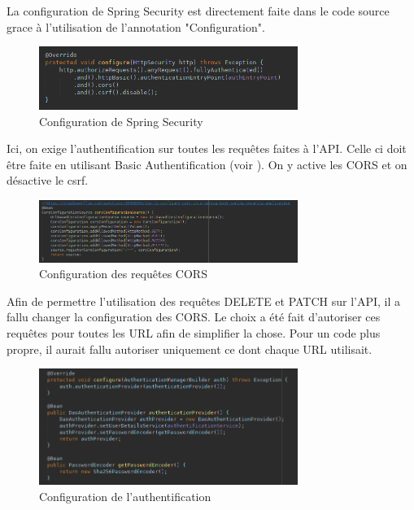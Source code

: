 			La configuration de Spring Security est directement faite dans le code source grace à l'utilisation de l'annotation "Configuration".

			\begin{figure}[H]
				\centering\includegraphics[width=0.75\textwidth, keepaspectratio]{res/config-httpsecurity.png}
				\caption{Configuration de Spring Security}
			\end{figure}

			Ici, on exige l'authentification sur toutes les requêtes faites à l'API. Celle ci doit être faite en utilisant Basic Authentification (voir ). On y active les CORS et on désactive le csrf.

			\begin{figure}[H]
				\centering\includegraphics[width=0.75\textwidth, keepaspectratio]{res/config-cors.png}
				\caption{Configuration des requêtes CORS}
			\end{figure}

			Afin de permettre l'utilisation des requêtes DELETE et PATCH sur l'API, il a fallu changer la configuration des CORS. Le choix a été fait d'autoriser ces requêtes pour toutes les URL afin de simplifier la chose. Pour un code plus propre, il aurait fallu autoriser uniquement ce dont chaque URL utilisait.

			\begin{figure}[H]
				\centering\includegraphics[width=0.75\textwidth, keepaspectratio]{res/config-authentification.png}
				\caption{Configuration de l'authentification}
			\end{figure}

